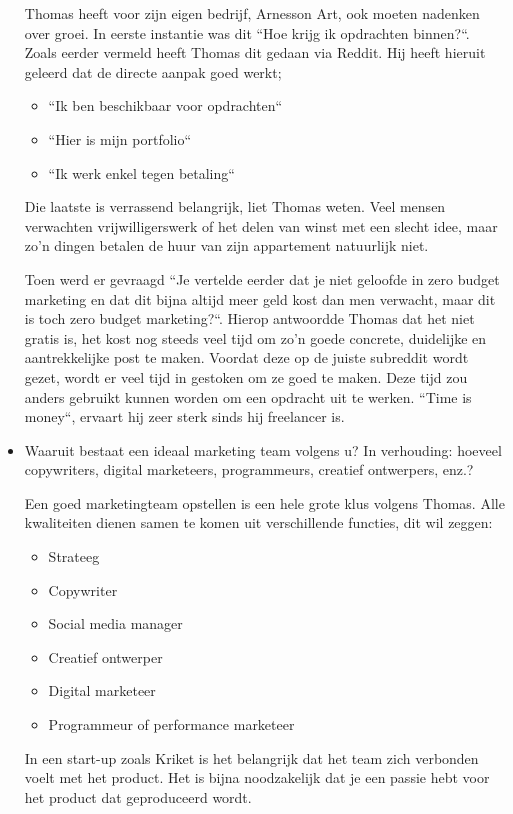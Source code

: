 \begin{itemize}
	Thomas heeft voor zijn eigen bedrijf, Arnesson Art, ook moeten nadenken over groei. In eerste instantie was dit ``Hoe krijg ik opdrachten binnen?``. Zoals eerder vermeld heeft Thomas dit gedaan via Reddit. Hij heeft hieruit geleerd dat de directe aanpak goed werkt;
	
	\begin{itemize} 
		\item ``Ik ben beschikbaar voor opdrachten``
		\item ``Hier is mijn portfolio``
		\item ``Ik werk enkel tegen betaling``
	\end{itemize} 
	
	Die laatste is verrassend belangrijk, liet Thomas weten. Veel mensen verwachten vrijwilligerswerk of het delen van winst met een slecht idee, maar zo'n dingen betalen de huur van zijn appartement natuurlijk niet.
	
	Toen werd er gevraagd ``Je vertelde eerder dat je niet geloofde in zero budget marketing en dat dit bijna altijd meer geld kost dan men verwacht, maar dit is toch zero budget marketing?``. Hierop antwoordde Thomas dat het niet gratis is, het kost nog steeds veel tijd om zo'n goede concrete, duidelijke en aantrekkelijke post te maken. Voordat deze op de juiste subreddit wordt gezet, wordt er veel tijd in gestoken om ze goed te maken. Deze tijd zou anders gebruikt kunnen worden om een opdracht uit te werken. ``Time is money``, ervaart hij zeer sterk sinds hij freelancer is.
	
	\item Waaruit bestaat een ideaal marketing team volgens u? In verhouding: hoeveel copywriters, digital marketeers, programmeurs, creatief ontwerpers, enz.?
	
	Een goed marketingteam opstellen is een hele grote klus volgens Thomas. Alle kwaliteiten dienen samen te komen uit verschillende functies, dit wil zeggen:
	
	\begin{itemize} 
		\item Strateeg
		\item Copywriter
		\item Social media manager
		\item Creatief ontwerper
		\item Digital marketeer
		\item Programmeur of performance marketeer
	\end{itemize} 
	
	In een start-up zoals Kriket is het belangrijk dat het team zich verbonden voelt met het product. Het is bijna noodzakelijk dat je een passie hebt voor het product dat geproduceerd wordt.
	

\end{itemize}
